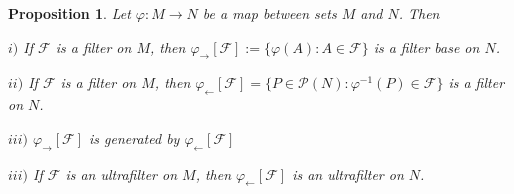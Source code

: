 \documentclass[12pt]{article}
\newtheorem{proposition}[theorem]{Proposition}
\begin{document}
\begin{proposition}\label{PrImageAndPreimageOfAFilter} Let $\varphi:M\to N$ be a map between sets $M$ and $N$. Then

$i)$ If $\mathcal{F}$ is a filter on $M$, then $\varphi_{\rightarrow}[\mathcal{F}]:=\{\varphi(A):A\in\mathcal{F}\}$ is a filter base on $N$.

$ii)$ If $\mathcal{F}$ is a filter on $M$, then $\varphi_{\leftarrow}[\mathcal{F}]=\{P\in\mathcal{P}(N):\varphi^{-1}(P)\in\mathcal{F}\}$ is a filter on $N$.

$iii)$ $\varphi_{\rightarrow}[\mathcal{F}]$ is generated by $\varphi_{\leftarrow}[\mathcal{F}]$

$iii)$ If $\mathcal{F}$ is an ultrafilter on $M$, then $\varphi_{\leftarrow}[\mathcal{F}]$ is an ultrafilter on $N$.
\end{proposition}
\end{document}
